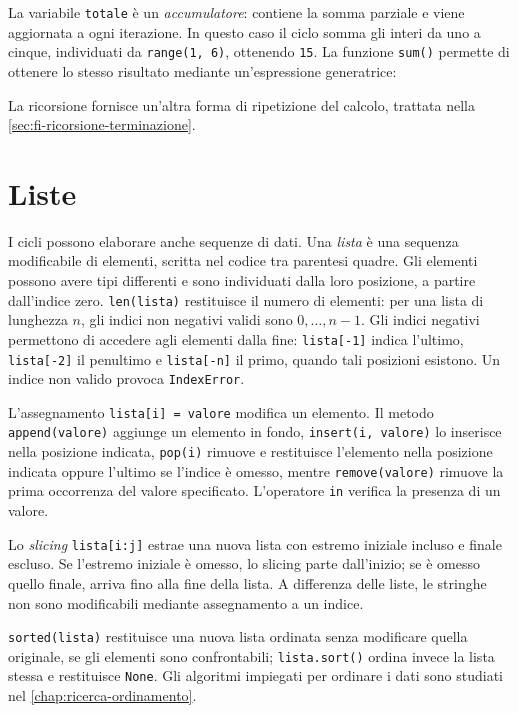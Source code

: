 

La variabile \texttt{totale} è un \emph{accumulatore}: contiene la somma
parziale e viene aggiornata a ogni iterazione. In questo caso il ciclo
somma gli interi da uno a cinque, individuati da \texttt{range(1, 6)},
ottenendo \texttt{15}. La funzione \texttt{sum()} permette di ottenere
lo stesso risultato mediante un'espressione generatrice:



La ricorsione fornisce un'altra forma di ripetizione del calcolo,
trattata nella \cref{sec:fi-ricorsione-terminazione}.

\clearpage

\section{Liste}
\label{sec:fi-python-liste}

I cicli possono elaborare anche sequenze di dati. Una \emph{lista} è
una sequenza modificabile di elementi, scritta nel codice tra
parentesi quadre. Gli elementi possono avere tipi differenti e sono
individuati dalla loro posizione, a partire dall'indice zero.
\texttt{len(lista)} restituisce il numero di elementi:
per una lista di lunghezza \(n\), gli indici non negativi validi sono
\(0,\ldots,n-1\). Gli indici negativi permettono di accedere agli
elementi dalla fine: \texttt{lista[-1]} indica l'ultimo,
\texttt{lista[-2]} il penultimo e \texttt{lista[-n]} il primo,
quando tali posizioni esistono. Un indice non valido provoca \texttt{IndexError}.

L'assegnamento \texttt{lista[i] = valore} modifica un elemento.
Il metodo \texttt{append(valore)} aggiunge un elemento in fondo,
\texttt{insert(i, valore)} lo inserisce nella posizione indicata,
\texttt{pop(i)} rimuove e restituisce l'elemento nella posizione
indicata oppure l'ultimo se l'indice è omesso, mentre
\texttt{remove(valore)} rimuove la prima occorrenza del valore
specificato. L'operatore \texttt{in} verifica la presenza di un valore.

Lo \emph{slicing} \texttt{lista[i:j]} estrae una nuova lista con estremo
iniziale incluso e finale escluso. Se l'estremo iniziale è omesso,
lo slicing parte dall'inizio; se è omesso quello finale, arriva fino
alla fine della lista. A differenza delle liste, le stringhe non sono
modificabili mediante assegnamento a un indice.

\texttt{sorted(lista)} restituisce una nuova lista ordinata senza
modificare quella originale, se gli elementi sono confrontabili;
\texttt{lista.sort()} ordina invece la lista stessa e restituisce
\texttt{None}. Gli algoritmi impiegati per ordinare i dati sono
studiati nel \cref{chap:ricerca-ordinamento}.

